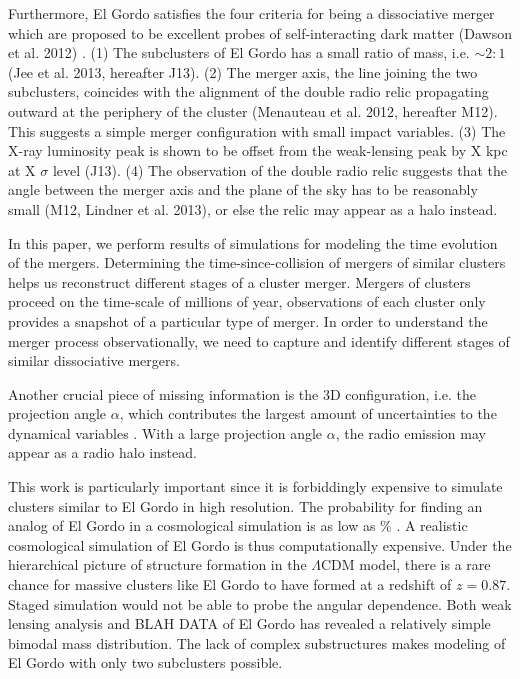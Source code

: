 Furthermore, El Gordo satisfies the four criteria for being a dissociative merger which are proposed to be excellent
probes of self-interacting dark matter (Dawson et al. 2012) . (1) The subclusters
of El Gordo has a small ratio of mass, i.e. $\sim 2:1$ (Jee et al. 2013,
hereafter J13). (2) The merger axis, the line joining the two subclusters,
coincides with the alignment of the double radio relic propagating outward at the periphery of the cluster (Menauteau et al. 2012,
hereafter M12). This suggests a simple merger configuration with small
impact variables.  (3) The X-ray luminosity peak is shown to be offset
from the weak-lensing peak by X kpc at X $\sigma$ level (J13). (4) The
observation of the double radio relic suggests that the angle between the
merger axis and the plane of the sky has to be reasonably small (M12,
Lindner et al. 2013), or else
the relic may appear as a halo instead. \citep{S13} \par 


In this paper, we perform results of simulations for modeling the time
evolution of the mergers. 
Determining the time-since-collision of mergers of similar clusters helps
us reconstruct different stages of a cluster merger.
Mergers of clusters proceed on the time-scale of millions of year,
observations of each cluster only provides a snapshot of a particular type
of merger. In order to understand the merger process observationally, 
we need to capture
and identify different stages of similar dissociative mergers. \par 

Another crucial piece of missing information is the 3D
configuration, i.e. the projection angle $\alpha$, which contributes the
largest amount of uncertainties to the dynamical variables \citep{D13}.
With a large projection angle $\alpha$, the radio emission may appear as a
radio halo instead.  \citep{S13}\par 
This work is particularly important since it is forbiddingly
expensive to simulate clusters similar to El Gordo in high resolution. 
The probability for finding an analog of El Gordo in a cosmological
simulation is as low as \% . A realistic cosmological simulation of
El Gordo is thus computationally expensive. Under the hierarchical picture
of structure formation in the $\Lambda$CDM model, there is a rare
chance for massive clusters like El Gordo to have formed at a redshift of
$z = 0.87$.  Staged simulation would not be able to probe the angular
dependence. 
Both weak lensing analysis and BLAH DATA of El Gordo \citep{Jee13} has revealed a
relatively simple bimodal mass distribution.  The lack of complex
substructures makes modeling of El Gordo with only two subclusters possible.

